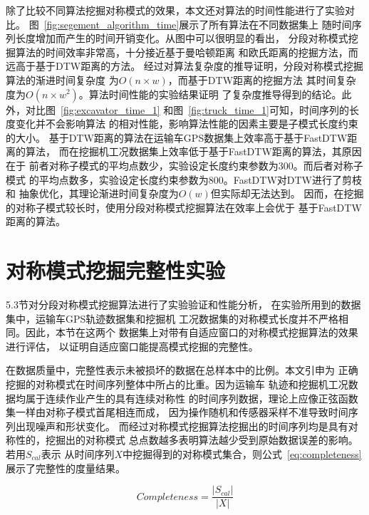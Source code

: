 除了比较不同算法挖掘对称模式的效果，本文还对算法的时间性能进行了实验对比。
图~\ref{fig:segement_algorithm_time}展示了所有算法在不同数据集上
随时间序列长度增加而产生的时间开销变化。从图中可以很明显的看出，
分段对称模式挖掘算法的时间效率非常高，十分接近基于曼哈顿距离
和欧氏距离的挖掘方法，而远高于基于DTW距离的方法。
经过对算法复杂度的推导证明，分段对称模式挖掘算法的渐进时间复杂度
为$O\left(n \times w\right)$，而基于DTW距离的挖掘方法
其时间复杂度为$O\left(n \times w^2\right)$。算法时间性能的实验结果证明
了复杂度推导得到的结论。此外，对比图~\ref{fig:excavator_time_1}
和图~\ref{fig:truck_time_1}可知，时间序列的长度变化并不会影响算法
的相对性能，影响算法性能的因素主要是子模式长度约束的大小。
基于DTW距离的算法在运输车GPS数据集上效率高于基于FastDTW距离的算法，
而在挖掘机工况数据集上效率低于基于FastDTW距离的算法，其原因在于
前者对称子模式的平均点数少，实验设定长度约束参数为300。而后者对称子模式
的平均点数多，实验设定长度约束参数为800。FastDTW对DTW进行了剪枝和
抽象优化，其理论渐进时间复杂度为$O\left(w\right)$但实际却无法达到。
因而，在挖掘的对称子模式较长时，使用分段对称模式挖掘算法在效率上会优于
基于FastDTW距离的算法。

\section{对称模式挖掘完整性实验}
5.3节对分段对称模式挖掘算法进行了实验验证和性能分析，
在实验所用到的数据集中，运输车GPS轨迹数据集和挖掘机
工况数据集的对称模式长度并不严格相同。因此，本节在这两个
数据集上对带有自适应窗口的对称模式挖掘算法的效果进行评估，
以证明自适应窗口能提高模式挖掘的完整性。

在数据质量中，完整性表示未被损坏的数据在总样本中的比例。本文引申为
正确挖掘的对称模式在时间序列整体中所占的比重。因为运输车
轨迹和挖掘机工况数据均属于连续作业产生的具有连续对称性
的时间序列数据，理论上应像正弦函数集一样由对称子模式首尾相连而成，
因为操作随机和传感器采样不准导致时间序列出现噪声和形状变化。
而经过对称模式挖掘算法挖掘出的时间序列均是具有对称性的，挖掘出的对称模式
总点数越多表明算法越少受到原始数据误差的影响。若用$S_{cal}$表示
从时间序列$X$中挖掘得到的对称模式集合，则公式~\ref{eq:completeness}
展示了完整性的度量结果。

\begin{equation}
    Completeness = \frac{\left|S_{cal}\right|}{\left|X\right|}
    \label{eq:completeness}
\end{equation}


